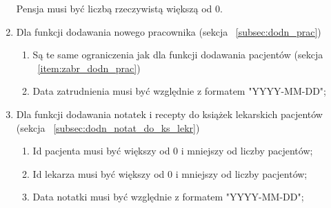 \begin{flushleft}
\begin{enumerate}
{        \hspace{2.5mm}Pensja musi być liczbą rzeczywistą większą od 0.}
        \item{Dla funkcji dodawania nowego pracownika (sekcja ~\ref{subsec:dodn_prac})
        \begin{enumerate}
            \item{Są te same ograniczenia jak dla funkcji dodawania pacjentów (sekcja ~\ref{item:zabr_dodn_prac})}
            \item{Data zatrudnienia musi być względnie z formatem "YYYY-MM-DD";}
        \end{enumerate}}
        \item{Dla funkcji dodawania notatek i recepty do książek lekarskich pacjentów (sekcja ~\ref{subsec:dodn_notat_do_ks_lekr})
        \begin{enumerate}
            \item{Id pacjenta musi być większy od 0 i mniejszy od liczby pacjentów;}
            \item{Id lekarza musi być większy od 0 i mniejszy od liczby pacjentów;}
            \item{Data notatki musi być względnie z formatem "YYYY-MM-DD";}
        \end{enumerate}}
    \end{enumerate}
\end{flushleft}